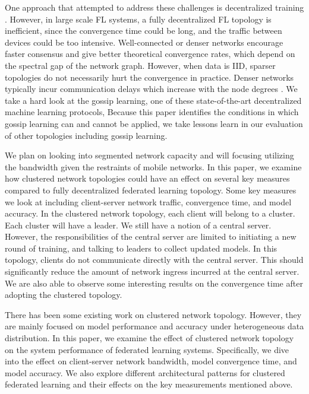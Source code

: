 \documentclass[10pt,twocolumn,letterpaper]{article}
\theoremstyle{definition}
\begin{document}
One approach that attempted to address these challenges is decentralized training \cite{2016arXiv160205629B,2017arXiv170509056L,2018arXiv180307068T,2016arXiv161005202V}. However, in large scale FL systems, a fully decentralized FL topology is inefficient, since the convergence time could be long, and the traffic between devices could be too intensive. Well-connected or denser networks encourage faster consensus and give better theoretical convergence rates, which depend on the spectral gap of the network graph. However, when data is IID, sparser topologies do not necessarily hurt the convergence in practice. Denser networks typically incur communication delays which increase with the node degrees \cite{2019arXiv191204977K}. 
We take a hard look at the gossip learning, one of these state-of-the-art decentralized machine learning protocols, Because this paper identifies the conditions in which gossip learning can and cannot be applied, we take lessons learn in our evaluation of other topologies including gossip learning.

We plan on looking into segmented network capacity and will focusing utilizing the bandwidth given the restraints of mobile networks.
In this paper, we examine how clustered network topologies could have an effect on several key measures compared to fully decentralized federated learning topology. Some key measures we look at including client-server network traffic, convergence time, and model accuracy. In the clustered network topology, each client will belong to a cluster. Each cluster will have a leader. We still have a notion of a central server. However, the responsibilities of the central server are limited to initiating a new round of training, and talking to leaders to collect updated models. In this topology, clients do not communicate directly with the central server. This should significantly reduce the amount of network ingress incurred at the central server. We are also able to observe some interesting results on the convergence time after adopting the clustered topology. 

There has been some existing work \cite{9207469,2019arXiv190606629G,9174890,9016505} on clustered network topology. However, they are mainly focused on model performance and accuracy under heterogeneous data distribution. In this paper, we examine the effect of clustered network topology on the system performance of federated learning systems. Specifically, we dive into the effect on client-server network bandwidth, model convergence time, and model accuracy. We also explore different architectural patterns for clustered federated learning and their effects on the key measurements mentioned above.
\end{document}

